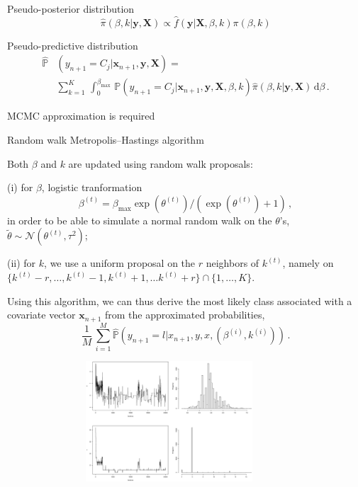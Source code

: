 \begin{slide}
\end{slide}\begin{slide}

Pseudo-posterior distribution
$$
\widehat{\pi}(\beta,k|\mathbf{y},\mathbf{X})\propto \widehat{f}(\mathbf{y}|\mathbf{X},\beta,k)\pi(\beta,k)
$$

\vs\pause Pseudo-predictive distribution
\begin{align*}
\widehat{\mathbb{P}}&(y_{n+1}=C_j|\mathbf{x}_{n+1},\mathbf{y},\mathbf{X})= \nonumber \\
  &\sum_{k=1}^K\,\int_0^{\beta_{\max}}\,\mathbb{P}(y_{n+1}=C_j|\mathbf{x}_{n+1},\mathbf{y},
    \mathbf{X},\beta,k)\widehat{\pi}(\beta,k|\mathbf{y},\mathbf{X})\,\text{d}\beta\,.
\end{align*}

\end{slide}\begin{slide}

MCMC approximation is required

\vs\pause Random walk Metropolis--Hastings algorithm

\vs\pause Both $\beta$ and $k$ are updated using random walk proposals:

\vs\pause (i) for $\beta$, logistic tranformation
$$
\beta^{(t)}=\beta_{\max{}}\exp(\theta^{(t)})\big/ (\exp(\theta^{(t)})+1)\,,
$$
in order to be able to simulate a normal random walk on the $\theta$'s, $\tilde\theta\sim\mathcal{N}(\theta^{(t)},\tau^2)$;

\end{slide}\begin{slide}

(ii) for $k$,  we use a uniform proposal on the $r$ neighbors of $k^{(t)}$, namely on $\{ k^{(t)}-r,\ldots,
k^{(t)}-1,k^{(t)}+1, \ldots k^{(t)}+r \}\cap\{1,\ldots,K\}$. 

\vs \pause Using this algorithm, we can thus derive the most likely class
associated with a covariate vector $\mathbf{x}_{n+1}$ from the
approximated probabilities,
$$
\frac{1}{M}\,\sum_{i=1}^M \widehat{\mathbb{P}}\left(y_{n+1}=l|x_{n+1},y,x,(\beta^{(i)},k^{(i)})\right)\,.
$$

\end{slide}\begin{slide}

\begin{figure}
\begin{center}
\includegraphics[width=10cm,height=4.5cm]{figures/res2.eps}
\end{center}
\end{figure}


\end{slide}
